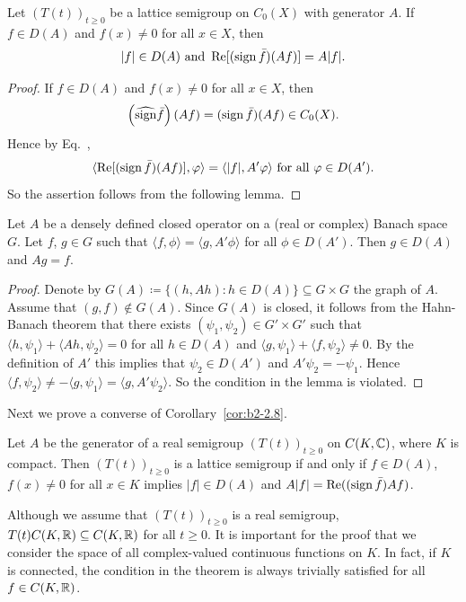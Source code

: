 \begin{corollary}\label{cor:b2-2.8}
Let $(T(t))_{t \geq 0}$ be a lattice semigroup on $C_{0}(X)$ with generator $A$.
If\/ $f \in D(A)$ and $f(x) \neq 0$ for all $x \in X$, then 
\[
|f| \in D(A) \text{ and } \mathop{}\!\mathrm{Re}[(\operatorname{sign} \bar{f})(Af)] = A|f| .
\]
\end{corollary}
\begin{proof}
If\/ $f \in D(A)$ and $f(x) \neq 0$ for all $x \in X$, then \[
\left(\widehat{\operatorname{sign}} \bar{f}\right)(Af) = (\operatorname{sign} \bar{f})(Af) \in C_{0}(X).
\]
Hence by Eq.~, 
\[
\langle \Re[(\sign \bar{f})(Af)],\phi \rangle = \langle |f|,A'\phi \rangle \text{ for all } \phi \in D(A').
\]
So the assertion follows from the following lemma.
\end{proof}
\begin{lemma}\label{lem:b2-2.9}
Let $A$ be a densely defined closed operator on a (real or complex) Banach space $G$.
Let $f$, $g \in G$ such that $\langle f,\phi \rangle = \langle g,A'\phi \rangle$ for all $\phi \in D(A')$.
Then $g \in D(A)$ and $Ag = f$.
\end{lemma}
\begin{proof}
Denote by $G(A) \coloneq \{(h,Ah) \colon h \in D(A)\} \subseteq G \times G$ the graph of\/ $A$.
Assume that $(g,f) \notin G(A)$.
Since $G(A)$ is closed, it follows from the Hahn-Banach theorem that there exists $(\psi_{1},\psi_{2}) \in G' \times G'$ such that $\langle h,\psi_{1} \rangle + \langle Ah,\psi_{2} \rangle = 0$ for all $h \in D(A)$ and $\langle g,\psi_{1} \rangle + \langle f,\psi_{2} \rangle \neq 0$.
By the definition of\/ $A'$ this implies that $\psi_{2} \in D(A')$ and $A'\psi_{2} = -\psi_{1}$.
Hence $\langle f,\psi_{2} \rangle \neq -\langle g,\psi_{1} \rangle = \langle g,A'\psi_{2} \rangle$.
So the condition in the lemma is violated.
\end{proof}
Next we prove a converse of Corollary~\ref{cor:b2-2.8}.
\begin{theorem}\label{thm:b2-2.10}
Let $A$ be the generator of a real semigroup $(T(t))_{t \geq 0}$ on $C(K,\mathbb{C})$, where $K$ is compact.
Then $(T(t))_{t \geq 0}$ is a lattice semigroup if and only if\/ $f \in D(A)$, $f(x) \neq 0$ for all $x \in K$ implies $|f| \in D(A)$ and $A|f| = \mathop{}\!\mathrm{Re}((\operatorname{sign} \bar{f})Af)$.
\end{theorem}
\begin{remark*}\label{rem:b2-2.10-KGK}
Although we assume that $(T(t))_{t \geq 0}$ is a real semigroup, \ie $T(t)C(K,\mathbb{R}) \subseteq C(K,\mathbb{R})$ for all $t \geq 0$.
It is important for the proof that we consider the space of all complex-valued continuous functions on $K$.
In fact, if\/ $K$ is connected, the condition in the theorem is always trivially satisfied for all $f \in C(K,\mathbb{R})$.
\end{remark*}
